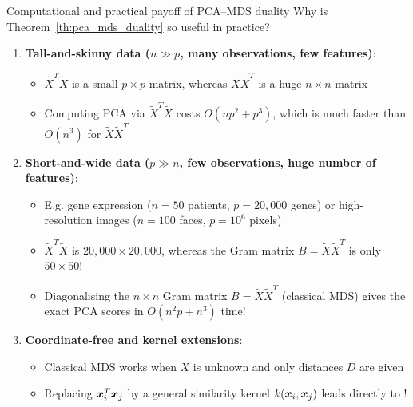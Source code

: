 \documentclass[aspectratio=169]{beamer}\usepackage[]{graphicx}\usepackage[]{xcolor}
\begin{document}
\begin{frame}{Computational and practical payoff of PCA--MDS duality}
Why is Theorem~\ref{th:pca_mds_duality} so useful in practice?
\vfill
\begin{enumerate}
\item \textbf{Tall-and-skinny data ($n \gg p$, many observations, few features)}:
\begin{itemize}
\item $\widetilde{X}^T \widetilde{X}$ is a small $p\times p$ matrix, whereas $\widetilde{X} \widetilde{X}^T$ is a huge $n\times n$ matrix
\item Computing PCA via $\widetilde{X}^T \widetilde{X}$ costs $O(np^2 + p^3)$, which is much faster than $O(n^3)$ for $\widetilde{X} \widetilde{X}^T$
\end{itemize}
\vfill
\item \textbf{Short-and-wide data ($p \gg n$, few observations, huge number of features)}:
\begin{itemize}
\item E.g. gene expression ($n = 50$ patients, $p = 20{,}000$ genes) or high-resolution images ($n = 100$ faces, $p = 10^6$ pixels)
\item $\widetilde{X}^T \widetilde{X}$ is $20{,}000 \times 20{,}000$, whereas the Gram matrix $B = \widetilde{X} \widetilde{X}^T$ is only $50\times 50$!
\item Diagonalising the $n\times n$ Gram matrix $B = \widetilde{X} \widetilde{X}^T$ (classical MDS) gives the exact PCA scores in $O(n^2 p + n^3)$ time!
\end{itemize}
\vfill
\item \textbf{Coordinate-free and kernel extensions}:
\begin{itemize}
\item Classical MDS works when $X$ is unknown and only distances $D$ are given
\item Replacing $\bm{x}_i^T\bm{x}_j$ by a general similarity kernel $k(\bm{x}_i,\bm{x}_j)$ leads directly to !
\end{itemize}
\end{enumerate}
\end{frame}


\end{document}
